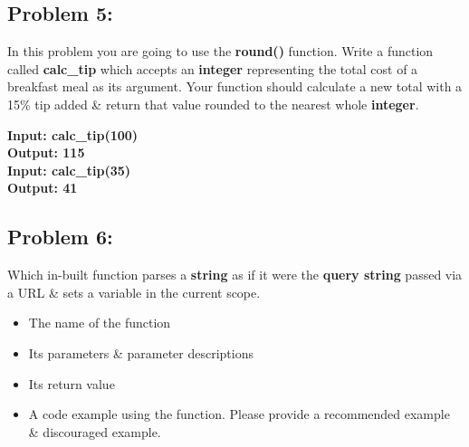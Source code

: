 \documentclass{article}
\begin{document}
\subsection{Problem 5:}
In this problem you are going to use the \textbf{round()} function. Write a function called \textbf{calc\_tip} which accepts an \textbf{integer} representing the total cost of a breakfast meal as its argument. Your function should calculate a new total with a 15\% tip added \& return that value rounded to the nearest whole \textbf{integer}.

\textbf{Input: calc\_tip(100)} \\
\textbf{Output: 115} \\

\textbf{Input: calc\_tip(35)} \\
\textbf{Output: 41} 

\subsection{Problem 6:}
Which in-built function parses a \textbf{string} as if it were the \textbf{query string} passed via a URL \& sets a variable in the current scope.

\begin{itemize}
    \item The name of the function
    \item Its parameters \& parameter descriptions
    \item Its return value
    \item A code example using the function. Please provide a recommended example \& discouraged example. 
\end{itemize}
\end{document}

